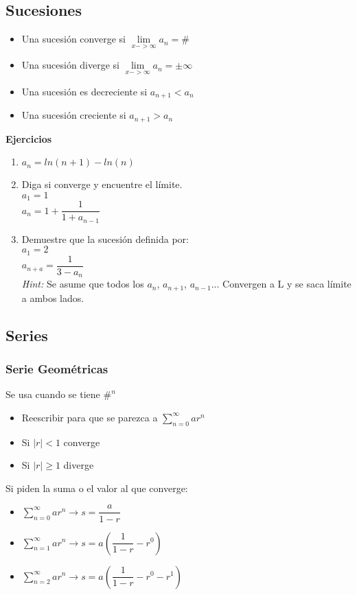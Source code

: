 \subsection{Sucesiones}
\begin{itemize}
	\item Una sucesión converge si $\lim\limits_{x -> \infty}a_n =\#$	
	\item Una sucesión diverge si $\lim\limits_{x -> \infty}a_n = \pm\infty$	
	\item Una sucesión es decreciente si $a_{n+1}<a_n$
	\item Una sucesión creciente si $a_{n+1}>a_n$
\end{itemize}


\textbf{Ejercicios}
\begin{enumerate}
	\item $a_n=ln(n+1)-ln(n)$
	\item Diga si converge y encuentre el límite.\\	
	$a_1=1$\\	
	$a_n=1+\dfrac{1}{1+a_{n-1}}$
	\item Demuestre que la sucesión definida por:\\
	$a_1=2$\\ 
	$a_{n+a}=\dfrac{1}{3-a_n}$\\
	\textit{Hint:} Se asume que todos los $a_n$, $a_{n+1}$, $a_{n-1}$... Convergen a L y se saca límite a ambos lados.
\end{enumerate}
\subsection{Series }
\subsubsection{Serie Geométricas}
Se usa cuando se tiene $\#^n$
 
\begin{itemize}
	\item Reescribir para que se parezca a $\sum_{n=0}^{\infty}ar^n$
	\item Si $|r|<1$ converge
	\item Si $|r|\ge1$ diverge
\end{itemize}

Si piden la suma o el valor al que converge:

\begin{itemize}
	\item $\sum_{n=0}^{\infty}ar^n\rightarrow s=\dfrac{a}{1-r}$
	\item $\sum_{n=1}^{\infty}ar^n\rightarrow s=a\left( \dfrac{1}{1-r}-r^0 \right) $
	\item $\sum_{n=2}^{\infty}ar^n\rightarrow s=a\left( \dfrac{1}{1-r}-r^0-r^1 \right) $
\end{itemize}
